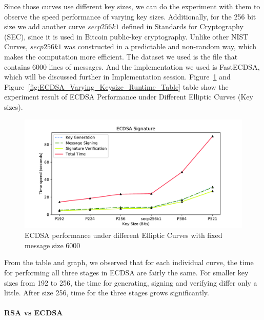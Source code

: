 \documentclass[10pt,sigconf]{acmart}
\begin{document}
Since those curves use different key sizes, we can do the experiment with them to observe the speed performance of varying key sizes. Additionally, for the 256 bit size we add another curve $secp256k1$ defined in Standards for Cryptography (SEC), since it is used in Bitcoin public-key cryptography. Unlike other NIST Curves, $secp256k1$ was constructed in a predictable and non-random way, which makes the computation more efficient. The dataset we used is the file that contains 6000 lines of messages. And the implementation we used is FastECDSA, which will be discussed further in Implementation session. Figure~\ref{fig:ECDSA_Varying_Keysize_Runtime_Graph} and Figure~\ref{fig:ECDSA_Varying_Keysize_Runtime_Table} table show the experiment result of ECDSA Performance under Different Elliptic Curves (Key sizes).

\begin{figure}
\centering
\includegraphics[scale=0.45]{ECDSA_Varying_Keysize_Runtime_Graph}
\caption{\small{ECDSA performance under different Elliptic Curves with fixed message size 6000}}
\label{fig:ECDSA_Varying_Keysize_Runtime_Graph}
\end{figure}

From the table and graph, we observed that for each individual curve, the time for performing all three stages in ECDSA are fairly the same. For smaller key sizes from 192 to 256, the time for generating, signing and verifying differ only a little. After size 256, time for the three stages grows significantly. 
\\
\\
\noindent \textbf{RSA vs ECDSA}
\end{document}

